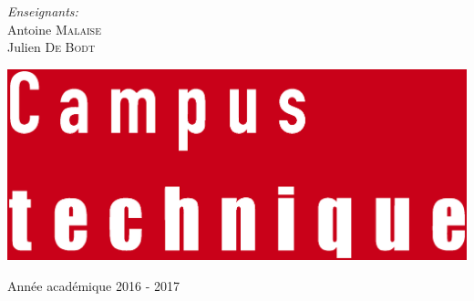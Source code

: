 \begin{center}
  \vspace{1.5cm}

  \begin{minipage}[t]{0.4 \textwidth}
    \begin{center} 
      \large \emph{Enseignants:} \\ 
      Antoine \textsc{Malaise} \\
      Julien \textsc{De Bodt}
    \end{center} 
  \end{minipage}

  \vspace{1cm}

  \includegraphics[scale=0.08]{textures/logo/technical.eps}

  \vspace{0.5cm}

  Année académique 2016 - 2017
\end{center}

\thispagestyle{empty}
